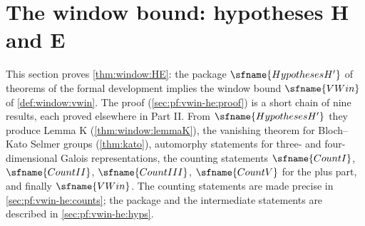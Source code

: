 \section{The window bound: hypotheses H and E}\label{sec:pf:vwin-he}

\providecommand{\vwinheQZ}{\Q_\ell/\Z_\ell}
\providecommand{\vwinhecyc}{\chi_{\mathrm{cyc}}}
\providecommand{\vwinheVt}{\widetilde V}
\providecommand{\vwinheX}{\mathcal X}
\providecommand{\vwinheA}{\mathcal A}
\providecommand{\vwinhesat}{\operatorname{sat}}
\providecommand{\vwinhecot}{\operatorname{Cot}}
\providecommand{\vwinhecotlen}{\lambda^{\mathrm{cot}}}
\providecommand{\vwinheloclen}{\lambda}
\providecommand{\vwinhesecs}{\operatorname{secs}}
\providecommand{\vwinheIrr}{\operatorname{Irr}}
\providecommand{\vwinheAnn}{\operatorname{Ann}}
\providecommand{\vwinheD}{\mathfrak D}
\providecommand{\vwinheXX}{\mathfrak X}
\providecommand{\vwinhecoker}{\lambda^{\mathrm{co}}}

This section proves \cref{thm:window:HE}: the package $\sfname{HypothesesH'}$ of theorems of the formal
development implies the window bound $\sfname{VWin}$ of \cref{def:window:vwin}. The proof
(\cref{sec:pf:vwin-he:proof}) is a short chain of nine results, each proved elsewhere in Part II. From
$\sfname{HypothesesH'}$ they produce Lemma K (\cref{thm:window:lemmaK}), the vanishing theorem for Bloch--Kato
Selmer groups (\cref{thm:kato}), automorphy statements for three- and four-dimensional Galois representations,
the counting statements $\sfname{CountI}$, $\sfname{CountII}$, $\sfname{CountIII}$, $\sfname{CountV}$ for the plus
part, and finally $\sfname{VWin}$. The counting statements are made precise in \cref{sec:pf:vwin-he:counts}; the
package and the intermediate statements are described in \cref{sec:pf:vwin-he:hyps}.

